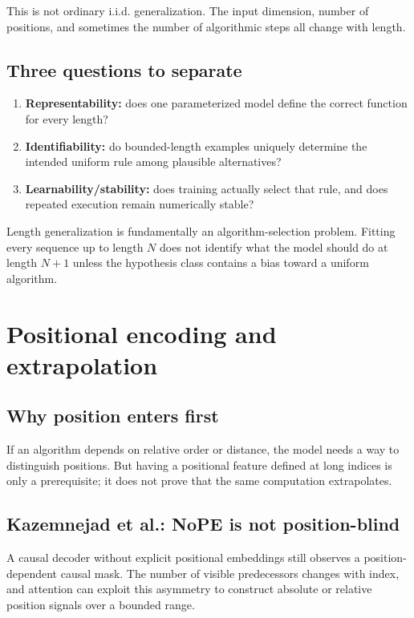 \documentclass[11pt,a4paper,oneside,openany]{memoir}
\theoremstyle{definition}
\begin{document}
This is not ordinary i.i.d. generalization.  The input dimension, number of positions, and sometimes the number of algorithmic steps all change with length.

\section{Three questions to separate}
\begin{enumerate}
\item \textbf{Representability:} does one parameterized model define the correct function for every length?
\item \textbf{Identifiability:} do bounded-length examples uniquely determine the intended uniform rule among plausible alternatives?
\item \textbf{Learnability/stability:} does training actually select that rule, and does repeated execution remain numerically stable?
\end{enumerate}

\begin{presentbox}
Length generalization is fundamentally an algorithm-selection problem.  Fitting every sequence up to length $N$ does not identify what the model should do at length $N+1$ unless the hypothesis class contains a bias toward a uniform algorithm.
\end{presentbox}

\chapter{Positional encoding and extrapolation}
\section{Why position enters first}
If an algorithm depends on relative order or distance, the model needs a way to distinguish positions.  But having a positional feature defined at long indices is only a prerequisite; it does not prove that the same computation extrapolates.

\section{Kazemnejad et al.: NoPE is not position-blind}
A causal decoder without explicit positional embeddings still observes a position-dependent causal mask.  The number of visible predecessors changes with index, and attention can exploit this asymmetry to construct absolute or relative position signals over a bounded range.
\end{document}
